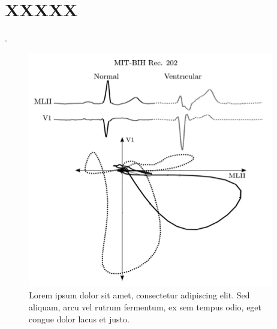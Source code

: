 \documentclass[
12pt,					%
openright,				%
oneside,				%
a4paper,				%
chapter=TITLE,			%
%
%
%
%
english,
brazil
]{abnt/abntex2itv_report}
\begin{document}
	
	\cleardoublepage
%	
	
	
	
	
	\newpage
	\begin{flushleft}
		\ABNTEXchapterfont\centering\Large\textbf{\MakeUppercase{\anexosname}}
	\end{flushleft}
	\vspace*{-36pt}
	\normalsize
	\normalfont
	\justify
	
	\anexos
	\justify
	\centering
	\chapter{XXXXX}
	\label{chapter:anexo1}
	
	\lipsum[1].
	
	\begin{figure}[htbp] %
		\centering
		\caption{Lorem ipsum dolor sit amet, consectetur adipiscing elit. Sed aliquam, arcu vel rutrum fermentum, ex sem tempus odio, eget congue dolor lacus et justo.}
		\label{fig:annex1}
		\includegraphics[width=0.65\linewidth]{img/examples/vcg.png} %
	\end{figure}
	
\end{document}
